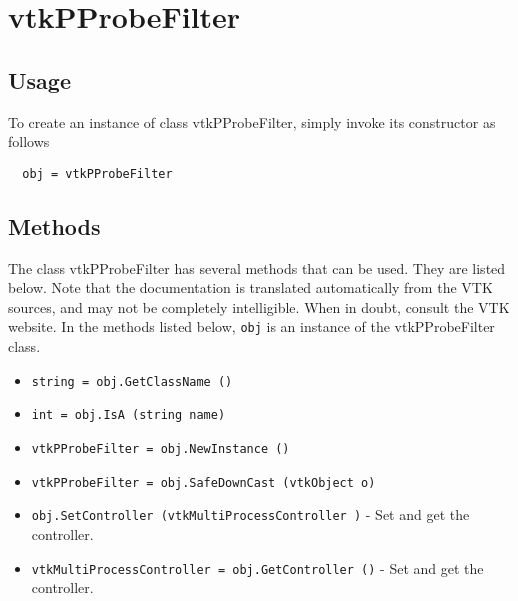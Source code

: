 \section{vtkPProbeFilter}

\subsection{Usage}


To create an instance of class vtkPProbeFilter, simply
invoke its constructor as follows
\begin{verbatim}
  obj = vtkPProbeFilter
\end{verbatim}
\subsection{Methods}

The class vtkPProbeFilter has several methods that can be used.
  They are listed below.
Note that the documentation is translated automatically from the VTK sources,
and may not be completely intelligible.  When in doubt, consult the VTK website.
In the methods listed below, \verb|obj| is an instance of the vtkPProbeFilter class.
\begin{itemize}
\item  \verb|string = obj.GetClassName ()|

\item  \verb|int = obj.IsA (string name)|

\item  \verb|vtkPProbeFilter = obj.NewInstance ()|

\item  \verb|vtkPProbeFilter = obj.SafeDownCast (vtkObject o)|

\item  \verb|obj.SetController (vtkMultiProcessController )| -  Set and get the controller.

\item  \verb|vtkMultiProcessController = obj.GetController ()| -  Set and get the controller.

\end{itemize}

